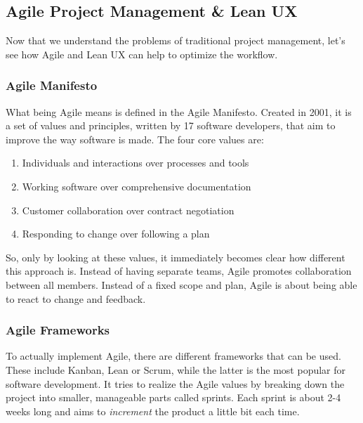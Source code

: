 \newpage
\subsection{Agile Project Management \& Lean UX} \label{Agile Project Management & Lean UX}
Now that we understand the problems of traditional project management, let's see how Agile and Lean
UX can help to optimize the workflow.

\subsubsection{Agile Manifesto}

What being Agile means is defined in the Agile Manifesto. Created in 2001, it is a set of values and
principles, written by 17 software developers, that aim to improve the way software is made. The
four core values are:
\begin{enumerate}
    \item Individuals and interactions over processes and tools
    \item Working software over comprehensive documentation
    \item Customer collaboration over contract negotiation
    \item Responding to change over following a plan
\end{enumerate}

So, only by looking at these values, it immediately becomes clear how different this approach is.
Instead of having separate teams, Agile promotes collaboration between all members. Instead of a 
fixed scope and plan, Agile is about being able to react to change and feedback. 

\subsubsection{Agile Frameworks}
To actually implement Agile, there are different frameworks that can be used. These include
Kanban, Lean or Scrum, while the latter is the most popular for software development. It tries to
realize the Agile values by breaking down the project into smaller, manageable parts called sprints.
Each sprint is about 2-4 weeks long and aims to \textit{increment} the product a little bit each
time.  


